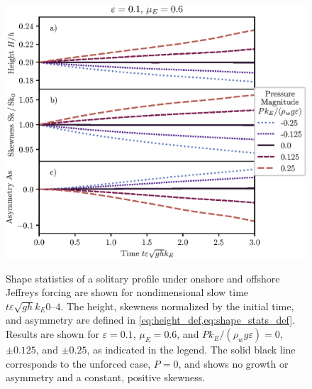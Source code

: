 \documentclass{jfm}
\renewcommand*{\epsilon}{\varepsilon}
\begin{document}
\begin{figure}
  \centering
  { %
    \label{fig:statistics_solitary:a}
    \label{fig:statistics_solitary:b}
    \label{fig:statistics_solitary:c}
  }
  \includegraphics{Skew-Asymm-No-Peak.eps}
  \caption{
    Shape statistics of a solitary profile under onshore and offshore
    Jeffreys forcing are shown for nondimensional slow time $t \epsilon
    \sqrt{gh} k_E \numrange{0}{4}$.
    The
    height,
    skewness normalized by the initial time, and
    asymmetry are defined in
    \cref{eq:height_def,eq:shape_stats_def}.
    Results are shown for $\epsilon=0.1$, $\mu_E = 0.6$, and $P
    k_E/(\rho_w g \epsilon) = 0$, $\pm 0.125$, and $\pm 0.25$, as
    indicated in the legend.
    The solid black line corresponds to the unforced case, $P = 0$, and
    shows no growth or asymmetry and a constant, positive skewness.
  }
  \label{fig:statistics_solitary}
\end{figure}
\end{document}
